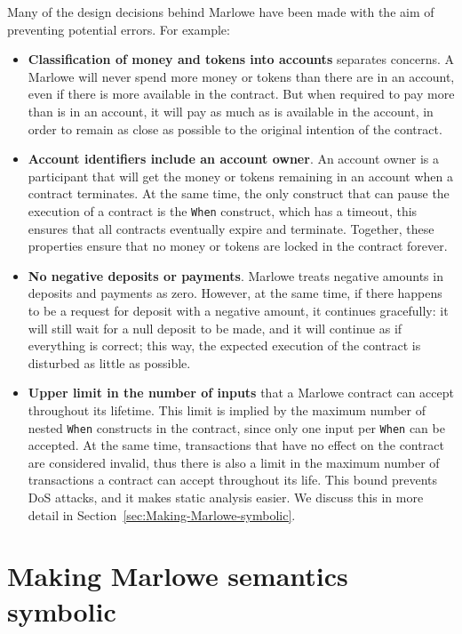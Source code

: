 \documentclass[english,runningheads]{llncs}
\begin{document}
Many of the design decisions behind Marlowe have been made with the
aim of preventing potential errors. For example:
\begin{itemize}
\item \textbf{Classification of money and tokens into accounts} separates concerns.
A Marlowe will never spend more money or tokens than there are in an
account, even if there is more available in the contract. But when
required to pay more than is in an account, it will pay as much as
is available in the account, in order to remain as close as possible
to the original intention of the contract.
\item \textbf{Account identifiers include an account owner}. An account owner
is a participant that will get the money or tokens remaining in an account
when a contract terminates. At the same time, the only construct that
can pause the execution of a contract is the \texttt{When} construct,
which has a timeout, this ensures that all contracts eventually expire
and terminate. Together, these properties ensure that no money or tokens
are locked in the contract forever.
\item \textbf{No negative deposits or payments}. Marlowe treats negative
amounts in deposits and payments as zero. However, at the same time,
if there happens to be a request for deposit with a negative amount,
it continues gracefully: it will still wait for a null deposit to
be made, and it will continue as if everything is correct; this way,
the expected execution of the contract is disturbed as little as possible.
\item \textbf{Upper limit in the number of inputs} that a Marlowe contract
can accept throughout its lifetime. This limit is implied by the maximum
number of nested \texttt{When} constructs in the contract, since only one input
per \texttt{When} can be accepted. At the same time, transactions that have
no effect on the contract are considered invalid, thus there is also
a limit in the maximum number of transactions a contract can accept
throughout its life. This bound prevents DoS attacks, and it makes static analysis
easier. We discuss this in more detail in Section~\ref{sec:Making-Marlowe-symbolic}.
\end{itemize}

\section{Making Marlowe semantics symbolic\label{sec:Making-Marlowe-symbolic}}
\end{document}
